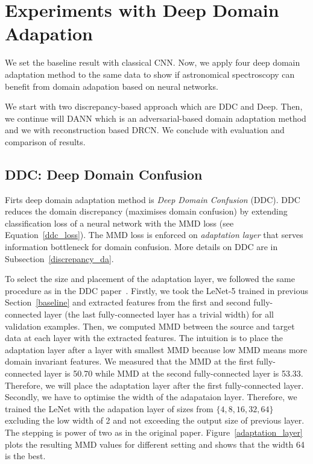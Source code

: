 \section{Experiments with Deep Domain Adapation}

We set the baseline result with classical CNN.
Now, we apply four deep domain adaptation method to the same data
to show if astronomical spectroscopy can benefit from domain adapation
based on neural networks.

We start with two discrepancy-based approach which are DDC and Deep.
Then, we continue will DANN
which is an adversarial-based domain adaptation method
and we with reconstruction based DRCN.
We conclude with evaluation and comparison of results.

\subsection{DDC: Deep Domain Confusion}

Firts deep domain adaptation method is \textit{Deep Domain Confusion} (DDC).
DDC reduces the domain discrepancy (maximises domain confusion)
by extending classification loss of a neural network with the MMD loss
(see Equation~\ref{ddc_loss}).
The MMD loss is enforced on \textit{adaptation layer}
that serves information bottleneck for domain confusion.
More details on DDC are in Subsection~\ref{discrepancy_da}.

To select the size and placement of the adaptation layer,
we followed the same procedure as in the DDC paper~\cite{tzeng2014}.
Firstly, we took the LeNet-5 trained in previous Section~\ref{baseline}
and extracted features from the first and second fully-connected layer
(the last fully-connected layer has a trivial width)
for all validation examples.
Then, we computed MMD between the source and target data at each layer with the extracted features.
The intuition is to place the adaptation layer after a layer with smallest MMD
because low MMD means more domain invariant features.
We measured that the MMD at the first fully-connected layer is 50.70
while MMD at the second fully-connected layer is 53.33.
Therefore, we will place the adaptation layer after the first fully-connected layer.
Secondly, we have to optimise the width of the adapataion layer.
Therefore, we trained the LeNet with the adapation layer of sizes
from \(\{4, 8, 16, 32, 64\}\) excluding the low width of 2
and not exceeding the output size of previous layer.
The stepping is power of two as in the original paper.
Figure~\ref{adaptation_layer} plots the resulting MMD values for different setting
and shows that the width 64 is the best.

